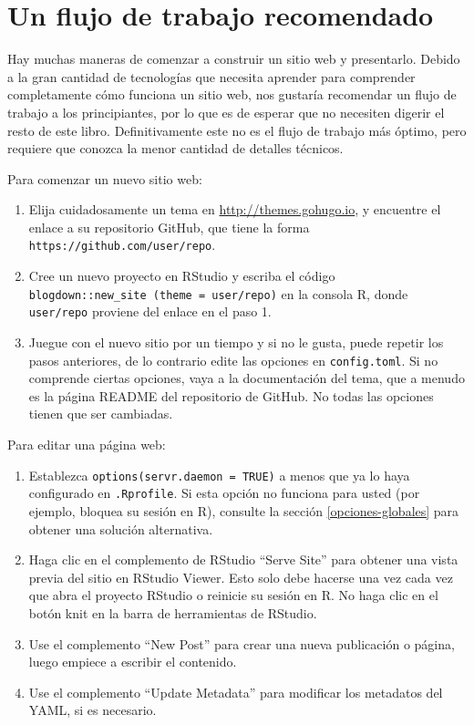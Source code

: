 \documentclass[12pt,]{krantz}
\theoremstyle{definition}
\theoremstyle{definition}
\theoremstyle{definition}
\theoremstyle{remark}
\begin{document}
\hypertarget{workflow}{%
\section{Un flujo de trabajo recomendado}\label{workflow}}

Hay muchas maneras de comenzar a construir un sitio web y presentarlo.
Debido a la gran cantidad de tecnologías que necesita aprender para
comprender completamente cómo funciona un sitio web, nos gustaría
recomendar un flujo de trabajo a los principiantes, por lo que es de
esperar que no necesiten digerir el resto de este libro. Definitivamente
este no es el flujo de trabajo más óptimo, pero requiere que conozca la
menor cantidad de detalles técnicos.

Para comenzar un nuevo sitio web:

\begin{enumerate}
\def\labelenumi{\arabic{enumi}.}
\item
  Elija cuidadosamente un tema en \url{http://themes.gohugo.io}, y
  encuentre el enlace a su repositorio GitHub, que tiene la forma
  \texttt{https://github.com/user/repo}.
\item
  Cree un nuevo proyecto en RStudio y escriba el código
  \texttt{blogdown::new\_site\ (theme\ =\ \textquotesingle{}user/repo\textquotesingle{})}
  en la consola R, donde \texttt{user/repo} proviene del enlace en el
  paso 1.
\item
  Juegue con el nuevo sitio por un tiempo y si no le gusta, puede
  repetir los pasos anteriores, de lo contrario edite las opciones en
  \texttt{config.toml}. Si no comprende ciertas opciones, vaya a la
  documentación del tema, que a menudo es la página README del
  repositorio de GitHub. No todas las opciones tienen que ser cambiadas.
\end{enumerate}

Para editar una página web:

\begin{enumerate}
\def\labelenumi{\arabic{enumi}.}
\item
  Establezca \texttt{options(servr.daemon\ =\ TRUE)} a menos que ya lo
  haya configurado en \texttt{.Rprofile}. Si esta opción no funciona
  para usted (por ejemplo, bloquea su sesión en R), consulte la sección
  \ref{opciones-globales} para obtener una solución alternativa.
\item
  Haga clic en el complemento de RStudio ``Serve Site'' para obtener una
  vista previa del sitio en RStudio Viewer. Esto solo debe hacerse una
  vez cada vez que abra el proyecto RStudio o reinicie su sesión en R.
  No haga clic en el botón knit en la barra de herramientas de RStudio.
\item
  Use el complemento ``New Post'' para crear una nueva publicación o
  página, luego empiece a escribir el contenido.
\item
  Use el complemento ``Update Metadata'' para modificar los metadatos
  del YAML, si es necesario.
\end{enumerate}
\end{document}
